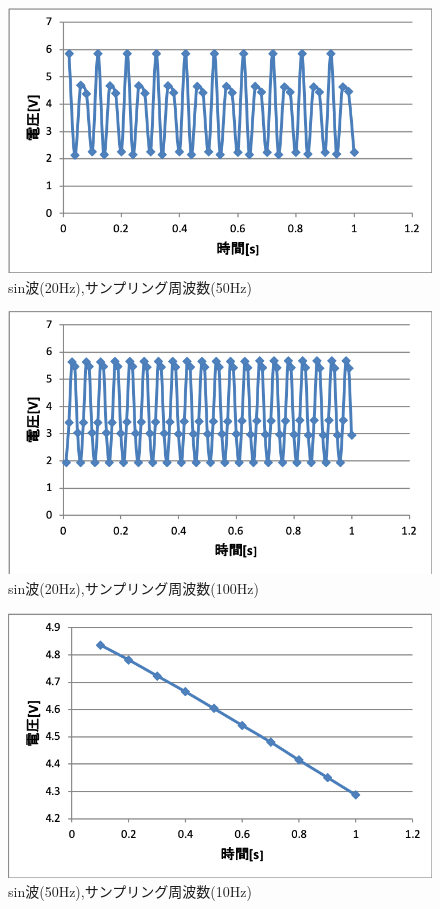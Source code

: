 \documentclass[11pt, a4paper,twocolumn]{jarticle}
\begin{document}
\begin{figure}[htbp]
 \begin{center}
  \includegraphics[width=0.8\linewidth]{fig8.png}
 \end{center}
 \caption{sin波(20Hz),サンプリング周波数(50Hz)}
 \label{fig:8}
\end{figure}

\begin{figure}[htbp]
 \begin{center}
  \includegraphics[width=0.8\linewidth]{fig9.png}
 \end{center}
 \caption{sin波(20Hz),サンプリング周波数(100Hz)}
 \label{fig:9}
\end{figure}

\begin{figure}[htbp]
 \begin{center}
  \includegraphics[width=0.8\linewidth]{fig10.png}
 \end{center}
 \caption{sin波(50Hz),サンプリング周波数(10Hz)}
 \label{fig:10}
\end{figure}
\end{document}
